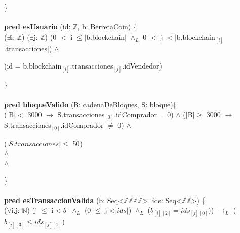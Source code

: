 \documentclass{article}
\newcommand{\Entero}{$\mathds{Z}$}
\newcommand{\Natural}{$\mathds{N}$}
\newcommand{\tuplaDeDosEnteros}{Seq\textless\Entero\texttimes\Entero\textgreater}
\newcommand{\tuplaDeCuatroEnteros}{Seq\textless\Entero\texttimes\Entero\texttimes\Entero\texttimes\Entero\textgreater}
\begin{document}
    \}\\\\

    \textbf{pred esUsuario} (id: \Entero, b: BerretaCoin) \{\\
        \indent\indent($\exists$i: \Entero) ($\exists$j: \Entero) (0 $<$ i $\leq |$b.blockchain$|$ $\land_L$ 0 $<$ j $< |$b.blockchain$_{[i]}$.transacciones$|$) $\land$

        \indent\indent(id = b.blockchain$_{[i]}$.transacciones$_{[j]}$.idVendedor)

    \}\\\\

    \textbf{pred bloqueValido} (B: cadenaDeBloques, S: bloque)\{\\
        \indent\indent ($|$B$|<$ 3000 $\rightarrow$ S.transacciones$_{[0]}$.idComprador = 0) $\land$
                        ($|$B$|\ge$ 3000 $\rightarrow$ S.transacciones$_{[0]}$.idComprador $\ne$ 0) $\land$
        
        \indent\indent ($|S.transacciones| \le$ 50)\\
        
        \indent\indent $\land$\\

        \indent{} $\land$
        
        \indent{}


    \}\\\\

    \textbf{pred esTransaccionValida} (b: \tuplaDeCuatroEnteros, ids: \tuplaDeDosEnteros) \{\\
        \indent\indent($\forall$i,j: \Natural) (j $\leq$ i \textless $|b|$ $\land_L$ (0 $\leq$ j \textless $|ids|$) $\land_L$ ($b_{[i][2]} = ids_{[j][0]}$))
                                                $\rightarrow_L$ ($b_{[i][3]} \leq ids_{[j][1]}$)
\end{document}
